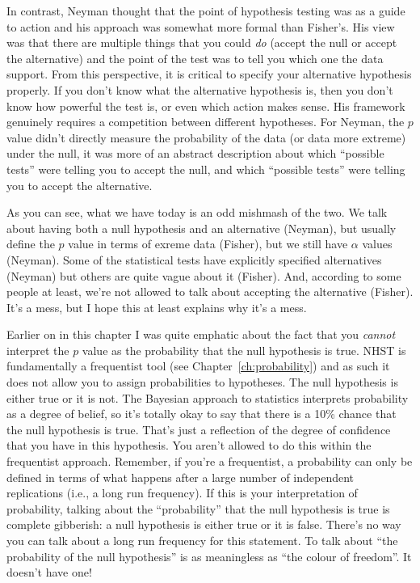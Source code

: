 In contrast, Neyman thought that the point of hypothesis testing was as a guide to action and his approach was somewhat more formal than Fisher's. His view was that there are multiple things that you could {\it do} (accept the null or accept the alternative) and the point of the test was to tell you which one the data support. From this perspective, it is critical to specify your alternative hypothesis properly. If you don't know what the alternative hypothesis is, then you don't know how powerful the test is, or even which action makes sense. His framework genuinely requires a competition between different hypotheses. For Neyman, the $p$ value didn't directly measure the probability of the data (or data more extreme) under the null, it was more of an abstract description about which ``possible tests'' were telling you to accept the null, and which ``possible tests'' were telling you to accept the alternative.

As you can see, what we have today is an odd mishmash of the two. We talk about having both a null hypothesis and an alternative (Neyman), but usually define the $p$ value in terms of exreme data (Fisher), but we still have $\alpha$ values (Neyman). Some of the statistical tests have explicitly specified alternatives (Neyman) but others are quite vague about it (Fisher). And, according to some people at least, we're not allowed to talk about accepting the alternative (Fisher). It's a mess, but I hope this at least explains why it's a mess.


Earlier on in this chapter I was quite emphatic about the fact that you {\it cannot} interpret the $p$ value as the probability that the null hypothesis is true. NHST is fundamentally a frequentist tool (see Chapter~\ref{ch:probability}) and as such it does not allow you to assign probabilities to hypotheses. The null hypothesis is either true or it is not. The Bayesian approach to statistics interprets probability as a degree of belief, so it's totally okay to say that there is a 10\% chance that the null hypothesis is true. That's just a reflection of the degree of confidence that you have in this hypothesis. You aren't allowed to do this within the frequentist approach. Remember, if you're a frequentist, a probability can only be defined in terms of what happens after a large number of independent replications (i.e., a long run frequency). If this is your interpretation of probability, talking about the ``probability'' that the null hypothesis is true is complete gibberish: a null hypothesis is either true or it is false. There's no way you can talk about a long run frequency for this statement. To talk about ``the probability of the null hypothesis'' is as meaningless as ``the colour of freedom''. It doesn't have one!

